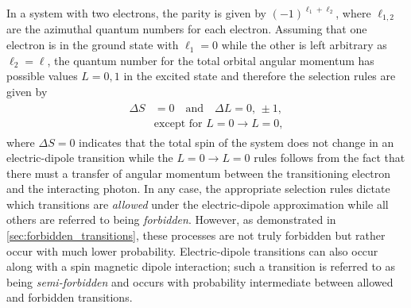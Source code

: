 In a system with two electrons, the parity is given by $(-1)^{\ell_1 + \ell_2}$, where $\ell_{1,2}$ are the azimuthal quantum numbers for each electron. 
Assuming that one electron is in the ground state with $\ell_1 = 0$ while the other is left arbitrary as $\ell_2 = \ell$, the quantum number for the total orbital angular momentum has possible values $L = 0,1$ in the excited state and therefore the selection rules are given by \cite{Rybicki86,Bethe57} 
\begin{align}\label{eq:helium_E1_selection_rules}
 \begin{split}
 \Delta S &= 0 \quad \text{and} \quad \Delta L = 0, \, \pm 1 , \\
 &\text{except for } L = 0 \to L = 0 ,
  \end{split}
 \end{align}
where $\Delta S = 0$ indicates that the total spin of the system does not change in an electric-dipole transition while the $L = 0 \to L = 0$ rules follows from the fact that there must a transfer of angular momentum between the transitioning electron and the interacting photon. 
In any case, the appropriate selection rules dictate which transitions are \emph{allowed} under the electric-dipole approximation while all others are referred to being \emph{forbidden}. 
However, as demonstrated in \cref{sec:forbidden_transitions}, these processes are not truly forbidden but rather occur with much lower probability. 
Electric-dipole transitions can also occur along with a spin magnetic dipole interaction; such a transition is referred to as being \emph{semi-forbidden} and occurs with probability intermediate between allowed and forbidden transitions. 

